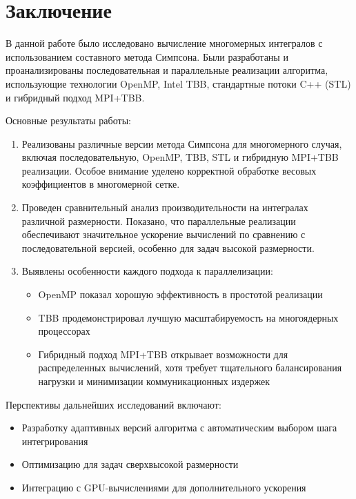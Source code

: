 \documentclass[12pt]{article}
\begin{document}
\newpage
\section{Заключение}
В данной работе было исследовано вычисление многомерных интегралов с использованием составного метода Симпсона. Были разработаны и проанализированы последовательная и параллельные реализации алгоритма, использующие технологии OpenMP, Intel TBB, стандартные потоки C++ (STL) и гибридный подход MPI+TBB.

Основные результаты работы:
\begin{enumerate}
    \item Реализованы различные версии метода Симпсона для многомерного случая, включая последовательную, OpenMP, TBB, STL и гибридную MPI+TBB реализации. Особое внимание уделено корректной обработке весовых коэффициентов в многомерной сетке.
    
    \item Проведен сравнительный анализ производительности на интегралах различной размерности. Показано, что параллельные реализации обеспечивают значительное ускорение вычислений по сравнению с последовательной версией, особенно для задач высокой размерности.
    
    \item Выявлены особенности каждого подхода к параллелизации:
    \begin{itemize}
        \item OpenMP показал хорошую эффективность в простотой реализации
        \item TBB продемонстрировал лучшую масштабируемость на многоядерных процессорах
        \item Гибридный подход MPI+TBB открывает возможности для распределенных вычислений, хотя требует тщательного балансирования нагрузки и минимизации коммуникационных издержек
    \end{itemize}
\end{enumerate}

Перспективы дальнейших исследований включают:
\begin{itemize}
    \item Разработку адаптивных версий алгоритма с автоматическим выбором шага интегрирования
    \item Оптимизацию для задач сверхвысокой размерности
    \item Интеграцию с GPU-вычислениями для дополнительного ускорения
\end{itemize}
\end{document}
